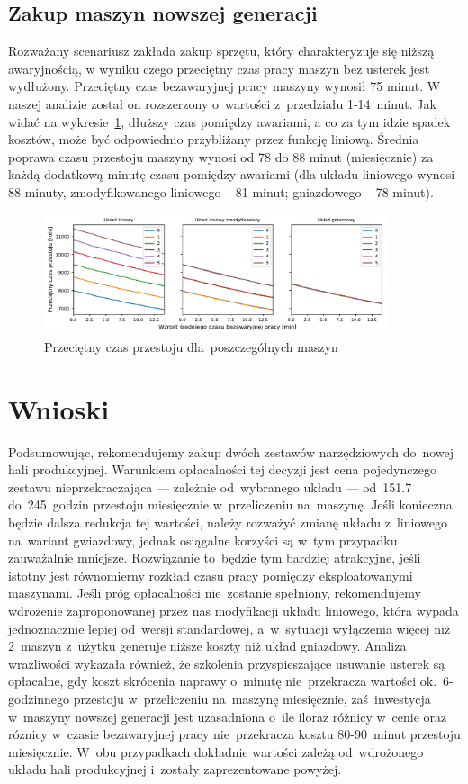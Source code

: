 \documentclass[12pt, a4paper, oneside]{mwart} %
\begin{document}
\subsection{Zakup maszyn nowszej generacji}
Rozważany scenariusz zakłada zakup sprzętu, który charakteryzuje się niższą awaryjnością, w wyniku czego przeciętny czas pracy maszyn bez usterek jest wydłużony. Przeciętny czas bezawaryjnej pracy maszyny wynosił 75 minut. W naszej analizie został on rozszerzony o~wartości z~przedziału 1-14~minut. Jak widać na wykresie~\ref{wyk_bezawaryjna_praca}, dłuższy czas pomiędzy awariami, a co za tym idzie spadek kosztów, może być odpowiednio przybliżany przez funkcję liniową. Średnia poprawa czasu przestoju maszyny wynosi od 78 do 88 minut (miesięcznie) za każdą dodatkową minutę czasu pomiędzy awariami (dla układu liniowego wynosi 88 minuty, zmodyfikowanego liniowego – 81 minut; gniazdowego – 78 minut).
\begin{figure}
\centering
\caption{Przeciętny czas przestoju dla~poszczególnych maszyn}
\label{wyk_bezawaryjna_praca}
\includegraphics[width = 0.9\textwidth]{wykresy/bezawaryjna_praca.pdf}
\end{figure}

\section{Wnioski}
Podsumowując, rekomendujemy zakup dwóch zestawów narzędziowych do~nowej hali produkcyjnej. Warunkiem opłacalności tej decyzji jest cena pojedynczego zestawu nieprzekraczająca --- zależnie od~wybranego układu --- od~151.7 do~245~godzin przestoju miesięcznie w~przeliczeniu na~maszynę. Jeśli konieczna będzie dalsza redukcja tej wartości, należy rozważyć zmianę układu z~liniowego na~wariant gwiazdowy, jednak osiągalne korzyści są w~tym przypadku zauważalnie mniejsze. Rozwiązanie to~będzie tym bardziej atrakcyjne, jeśli istotny jest równomierny rozkład czasu pracy pomiędzy eksploatowanymi maszynami. Jeśli próg opłacalności nie~zostanie spełniony, rekomendujemy wdrożenie zaproponowanej przez nas modyfikacji układu liniowego, która wypada jednoznacznie lepiej od~wersji standardowej, a~w~sytuacji wyłączenia więcej niż 2~maszyn z~użytku generuje niższe koszty niż układ gniazdowy. Analiza wrażliwości wykazała również, że szkolenia przyspieszające usuwanie usterek są opłacalne, gdy koszt skrócenia naprawy o~minutę nie~przekracza wartości ok.~6-godzinnego przestoju w~przeliczeniu na~maszynę miesięcznie, zaś~inwestycja w~maszyny nowszej generacji jest uzasadniona o~ile iloraz różnicy w~cenie oraz różnicy w~czasie bezawaryjnej pracy nie~przekracza kosztu 80-90~minut przestoju miesięcznie. W~obu przypadkach dokładnie wartości zależą od~wdrożonego układu hali produkcyjnej i~zostały zaprezentowane powyżej.
\end{document}
